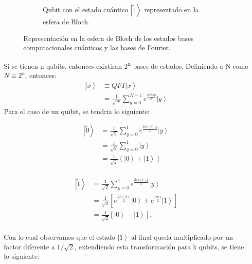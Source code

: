 \begin{figure}[H]
\begin{subfigure}{0.5\linewidth}
        \caption{Qubit con el estado cuántico $\left|\tilde{1} \right\rangle$ representado en la esfera de Bloch.}
    \end{subfigure}
\caption{Representación en la esfera de Bloch de los estados bases computacionales cuánticos y las bases de Fourier.}
\label{fig:QFT_bloch}
\end{figure}
Si se tienen n qubits, entonces existiran 2\textsuperscript{n} bases de estados. Definiendo a N como $N\equiv 2^n$, entonces:
\begin{align*}
    \left|\tilde{x} \right\rangle &\equiv QFT\left| x \right\rangle\\
    &= \frac{1}{\sqrt{N}} \sum\limits_{y=0}^{N-1} e^{\frac{2\pi i x y}{N}} \left|y \right\rangle
\end{align*}
Para el caso de un quibit, se tendria lo siguiente:\\
\begin{minipage}{0.5\linewidth}
    \begin{align*}
        \left|\tilde{0} \right\rangle &= \frac{1}{\sqrt{2}} \sum\limits_{y=0}^1 e^{\frac{2\pi i (0)y}{2}} \left|y \right\rangle \\
        &= \frac{1}{\sqrt{2}} \sum\limits_{y=0}^1 \left|y \right\rangle \\
        &= \frac{1}{\sqrt{2}} \left(\left| 0\right\rangle + \left| 1\right\rangle \right) \\
    \end{align*}  
\end{minipage}
\begin{minipage}{0.5\linewidth}
    \begin{align*}
        \left| \tilde{1} \right\rangle & = \frac{1}{\sqrt{2}} \sum\limits_{y=0}^1 e^{\frac{2\pi i (1)y}{2}} \left|y \right\rangle \\
        &= \frac{1}{\sqrt{2}} \left[e^{\frac{2\pi i(0)}{2}}\left| 0\right\rangle+ e^{\frac{2  \pi i 1}{2}} \left|1 \right\rangle\right] \\
        &= \frac{1}{\sqrt{2}} \left[\left|0 \right\rangle-\left|1 \right\rangle \right].\\
    \end{align*}
\end{minipage}
Con lo cual observamos que el estado $\left| 1\right\rangle$ al final queda multiplicado por un factor diferente a $1/\sqrt{2}$, extendiendo esta transformación para
k qubits, se tiene lo siguiente:
